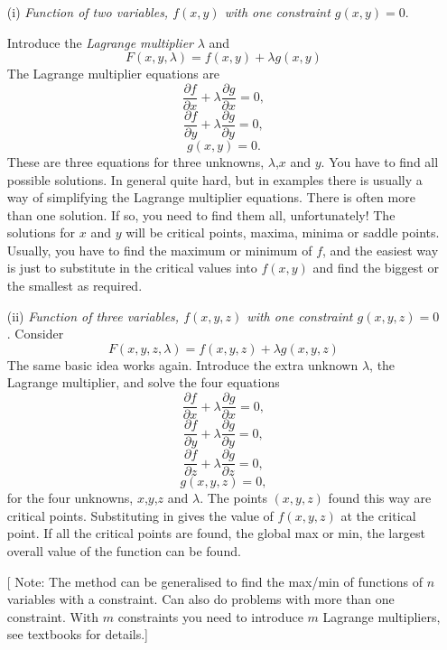 \documentclass{article}
\begin{document}
\begin{enumerate}

\item[(i)] {\it Function of two variables, $f(x,y)$ with one constraint
$g(x,y)=0$}.

Introduce the {\it Lagrange multiplier} $\lambda$ and
$$
F(x,y,\lambda)=f(x,y)+ \lambda g(x,y)
$$
 The Lagrange multiplier equations are
$$ \frac{\partial f}{\partial x} + \lambda \frac{\partial g}{\partial x}=0, $$
$$ \frac{\partial f}{\partial y} + \lambda \frac{\partial g}{\partial y}=0, $$
$$g(x,y)=0.$$
These are three equations for three unknowns, $\lambda$,$x$ and
$y$. You have to find all possible solutions. In general quite
hard, but in examples there is usually a way of simplifying the
Lagrange multiplier equations. There is often more than one
solution. If so, you need to find them all, unfortunately! The
solutions for $x$ and $y$ will be critical points, maxima, minima
or saddle points. Usually, you have to find the maximum or minimum
of $f$, and the easiest way is just to substitute in the critical
values into $f(x,y)$ and find the biggest or the smallest as
required.



\item[(ii)] {\it Function of three variables, $f(x,y,z)$ with one
constraint $g(x,y,z)=0$}. Consider
$$
F(x,y,z,\lambda)=f(x,y,z)+ \lambda g(x,y,z)
$$
The same basic idea works again. Introduce the extra unknown
$\lambda$, the Lagrange multiplier, and solve the four equations
$$ \frac{\partial f}{\partial x} + \lambda \frac{\partial g}{\partial x}=0, $$
$$ \frac{\partial f}{\partial y} + \lambda \frac{\partial g}{\partial y}=0, $$
$$ \frac{\partial f}{\partial z} + \lambda \frac{\partial g}{\partial z}=0, $$
$$g(x,y,z)=0,$$
for the four unknowns, $x$,$y$,$z$ and $\lambda$. The points
$(x,y,z)$ found this way are critical points. Substituting in
gives the value of $f(x,y,z)$ at the critical point. If all the
critical points are found, the global max or min, the largest
overall value of the function can be found.

[ Note: The method can be generalised to find the max/min of
functions of $n$ variables with a constraint. Can also do problems
with more than one constraint. With $m$ constraints you need to
introduce $m$ Lagrange multipliers, see textbooks for details.]

\end{enumerate}

\bigskip
\end{document}
